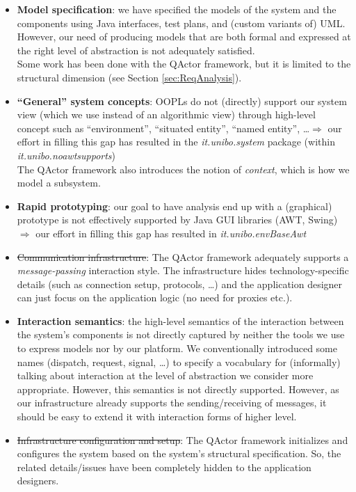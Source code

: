 \documentclass{article}
\newcommand{\mycolor}{myrgb}
\newcommand{\colorize}[1]{{\color{\mycolor}#1}}
\begin{document}
\begin{itemize}
  \item \textbf{Model specification}: we have specified the models of the
  system and the components using Java interfaces, test plans, and (custom
  variants of) UML.
  However, our need of producing models that are both formal and expressed at the right
  level of abstraction is not adequately satisfied.\\
  \colorize{Some work has been done with the QActor framework, but it is
  limited to the structural dimension (see Section \ref{sec:ReqAnalysis}).}
  
  \item \textbf{``General'' system concepts}: OOPLs do not (directly)
  support our system view (which we use instead of an algorithmic view) through
  high-level concept such as ``environment'', ``situated entity'', ``named
  entity'', \ldots $\Rightarrow$ our effort in filling this gap has resulted in
  the \emph{it.unibo.system} package (within \emph{it.unibo.noawtsupports})\\
  \colorize{The QActor framework also introduces the notion of \emph{context},
  which is how we model a subsystem.}
  
  \item \textbf{Rapid prototyping}: our goal to have analysis end up with a
  (graphical) prototype is not effectively supported by Java GUI libraries
  (AWT, Swing) $\Rightarrow$ our effort in filling this gap has resulted in
  \emph{it.unibo.envBaseAwt}
  
  \item \st{Communication infrastructure}: \colorize{The QActor
  framework adequately supports a \emph{message-passing} interaction style. The
  infrastructure hides technology-specific details (such as connection setup,
  protocols, \ldots) and the application designer can just focus on the application
  logic (no need for proxies etc.).}
  
  \item \textbf{Interaction semantics}: the high-level semantics of the
  interaction between the system's components is not directly captured by neither the tools we use
  to express models nor by our platform.  We conventionally
  introduced some names (dispatch, request, signal, \ldots) to
  specify a vocabulary for (informally) talking about interaction at the level
  of abstraction we consider more appropriate. However, this semantics is not
  directly supported. \colorize{However, as our infrastructure already supports
  the sending/receiving of messages, it should be easy to extend it with
  interaction forms of higher level.}
  
  \item \colorize{\st{Infrastructure configuration and setup}: 
  	The QActor framework initializes and configures the system based on 
  	the system's structural specification. So, the related details/issues have
  	been completely hidden to the application designers. }
\end{itemize}
 
\end{document}
